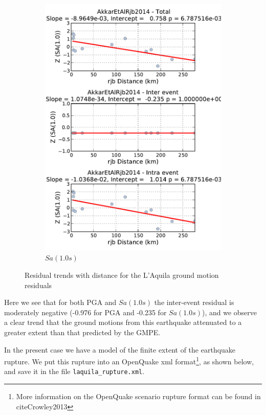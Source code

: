 \begin{figure}[htb]
\begin{subfigure}[b]{0.49\textwidth}
      \includegraphics[width=\textwidth]{./figures/hazard/LAquila_Residuals_with_distance_sa1.pdf}
      \caption{$Sa \left( {1.0 s} \right)$ }
      \label{fig:laquila_resid_sa1}
  \end{subfigure}
  \caption{Residual trends with distance for the L'Aquila ground motion residuals}
  \label{fig:laquila_resid_distance}
\end{figure}

Here we see that for both PGA and $Sa \left( {1.0 s} \right)$ the inter-event residual is moderately negative (-0.976 for PGA and -0.235 for $Sa \left( {1.0 s} \right)$), and we observe a clear trend that the ground motions from this earthquake attenuated to a greater extent than that predicted by the GMPE. 

In the present case we have a model of the finite extent of the earthquake rupture. We put this rupture into an OpenQuake xml format\footnote{More information on the OpenQuake scenario rupture format can be found in citeCrowley2013}, as shown below, and save it in the file \verb=laquila_rupture.xml=.

